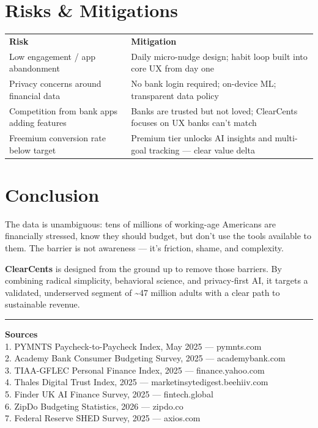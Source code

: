\documentclass[11pt,a4paper]{article}
\begin{document}
\section{Risks \& Mitigations}

\vspace{0.5em}
\begin{tabularx}{\textwidth}{L{5cm} L{10cm}}
\color{white}\textbf{Risk} & \color{white}\textbf{Mitigation} \\
Low engagement / app abandonment &
  Daily micro-nudge design; habit loop built into core UX from day one \\
Privacy concerns around financial data &
  No bank login required; on-device ML; transparent data policy \\
Competition from bank apps adding features &
  Banks are trusted but not loved; ClearCents focuses on UX banks can't match \\
Freemium conversion rate below target &
  Premium tier unlocks AI insights and multi-goal tracking --- clear value delta \\
\end{tabularx}
\vspace{0.5em}

\section{Conclusion}

The data is unambiguous: tens of millions of working-age Americans are financially stressed,
know they should budget, but don't use the tools available to them. The barrier is not
awareness --- it's friction, shame, and complexity.

\textbf{ClearCents} is designed from the ground up to remove those barriers. By combining
radical simplicity, behavioral science, and privacy-first AI, it targets a validated,
underserved segment of \textasciitilde47 million adults with a clear path to sustainable revenue.

\vspace{1em}
\hrule
\vspace{0.5em}
{\footnotesize\textbf{Sources}}\\
{\footnotesize
1. PYMNTS Paycheck-to-Paycheck Index, May 2025 --- pymnts.com\\
2. Academy Bank Consumer Budgeting Survey, 2025 --- academybank.com\\
3. TIAA-GFLEC Personal Finance Index, 2025 --- finance.yahoo.com\\
4. Thales Digital Trust Index, 2025 --- marketinsytedigest.beehiiv.com\\
5. Finder UK AI Finance Survey, 2025 --- fintech.global\\
6. ZipDo Budgeting Statistics, 2026 --- zipdo.co\\
7. Federal Reserve SHED Survey, 2025 --- axios.com\\
}
\end{document}
